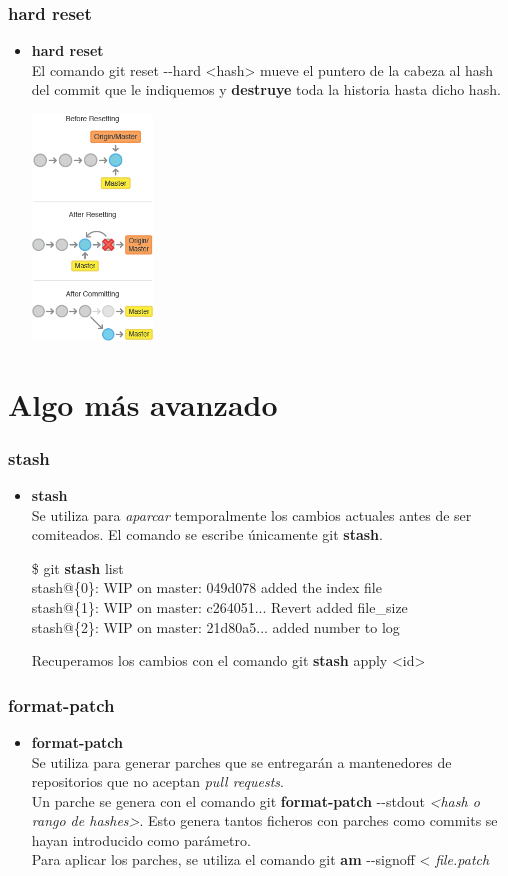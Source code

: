 \frame
{
\frametitle{hard reset}
\begin{itemize}
 \item \textbf{hard reset}\\ \indent
 El comando git reset -{}-hard <hash> mueve el puntero de la cabeza al hash del commit que le indiquemos y \textbf{destruye} toda la historia hasta dicho hash.\\
 \begin{center}
    \includegraphics[height=6cm]{imgs/reset-hard.png}
 \end{center}
\end{itemize}
}

\section{Algo más avanzado}
\frame
{
\frametitle{stash}
\begin{itemize}
 \item \textbf{stash}\\ \indent
 Se utiliza para \textit{aparcar} temporalmente los cambios actuales antes de ser comiteados. El comando se escribe únicamente git \textbf{stash}.
 \begin{framed}
 \$ git \textbf{stash} list\\
 stash@\{0\}: WIP on master: 049d078 added the index file\\
 stash@\{1\}: WIP on master: c264051... Revert added file\_size\\
 stash@\{2\}: WIP on master: 21d80a5... added number to log
 \end{framed}
 
 Recuperamos los cambios con el comando git \textbf{stash} apply <id>
\end{itemize}
}

\frame
{
\frametitle{format-patch}
\begin{itemize}
 \item \textbf{format-patch}\\ \indent
 Se utiliza para generar parches que se entregarán a mantenedores de repositorios que no aceptan \textit{pull requests}.\\ \vspace{0.2cm}
 Un parche se genera con el comando git \textbf{format-patch} -{}-stdout \textit{<hash o rango de hashes>}. Esto genera tantos ficheros con parches como commits se hayan introducido como parámetro.\\ \vspace{0.2cm}
 Para aplicar los parches, se utiliza el comando git \textbf{am} -{}-signoff < \textit{file.patch}
\end{itemize}
}


